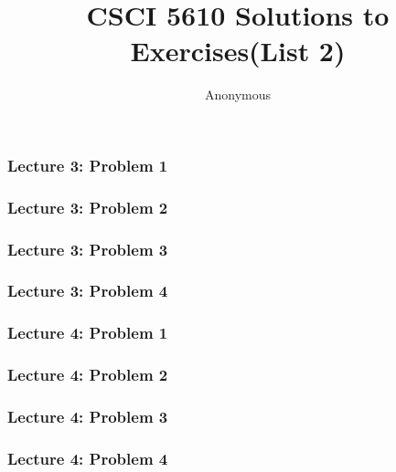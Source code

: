 \documentclass{beamer}
\title{CSCI 5610 Solutions to Exercises(List 2)}
\author{Anonymous}
\begin{document}
 
\begin{frame}
    \titlepage
\end{frame}
\begin{frame}
	\frametitle{Lecture 3: Problem 1}

\end{frame}



\begin{frame}
	\frametitle{Lecture 3: Problem 2}


\end{frame}


\begin{frame}
	\frametitle{Lecture 3: Problem 3}

\end{frame}

\begin{frame}
	\frametitle{Lecture 3: Problem 4}

	
\end{frame}

\begin{frame}
	\frametitle{Lecture 4: Problem 1}

	
	
\end{frame}

\begin{frame}
	\frametitle{Lecture 4: Problem 2}
	
	
	
\end{frame}

\begin{frame}
	\frametitle{Lecture 4: Problem 3}
	
	
	
\end{frame}

\begin{frame}
	\frametitle{Lecture 4: Problem 4}
	
	
	
\end{frame}
\end{document}
